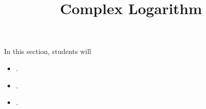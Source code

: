 \documentclass{ximera}
\title{Complex Logarithm}
\begin{document}
\begin{abstract}
%
\end{abstract}
\maketitle





\begin{sectionOutcomes}
In this section, students will 

\begin{itemize}
\item .
\item .
\item .
\end{itemize}
\end{sectionOutcomes}
\end{document}
